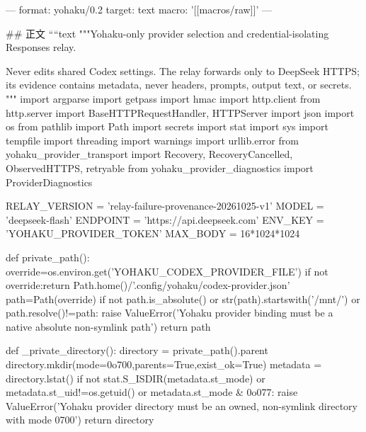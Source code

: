 ---
format: yohaku/0.2
target: text
macro: '[[macros/raw]]'
---

## 正文
````text
"""Yohaku-only provider selection and credential-isolating Responses relay.

Never edits shared Codex settings. The relay forwards only to DeepSeek HTTPS;
its evidence contains metadata, never headers, prompts, output text, or secrets.
"""
import argparse
import getpass
import hmac
import http.client
from http.server import BaseHTTPRequestHandler, HTTPServer
import json
import os
from pathlib import Path
import secrets
import stat
import sys
import tempfile
import threading
import warnings
import urllib.error
from yohaku_provider_transport import Recovery, RecoveryCancelled, ObservedHTTPS, retryable
from yohaku_provider_diagnostics import ProviderDiagnostics

RELAY_VERSION = 'relay-failure-provenance-20261025-v1'
MODEL = 'deepseek-flash'
ENDPOINT = 'https://api.deepseek.com'
ENV_KEY = 'YOHAKU_PROVIDER_TOKEN'
MAX_BODY = 16*1024*1024


def private_path():
    override=os.environ.get('YOHAKU_CODEX_PROVIDER_FILE')
    if not override:return Path.home()/'.config/yohaku/codex-provider.json'
    path=Path(override)
    if not path.is_absolute() or str(path).startswith('/mnt/') or path.resolve()!=path:
        raise ValueError('Yohaku provider binding must be a native absolute non-symlink path')
    return path


def _private_directory():
    directory = private_path().parent
    directory.mkdir(mode=0o700,parents=True,exist_ok=True)
    metadata = directory.lstat()
    if not stat.S_ISDIR(metadata.st_mode) or metadata.st_uid!=os.getuid() or metadata.st_mode & 0o077:
        raise ValueError('Yohaku provider directory must be an owned, non-symlink directory with mode 0700')
    return directory



